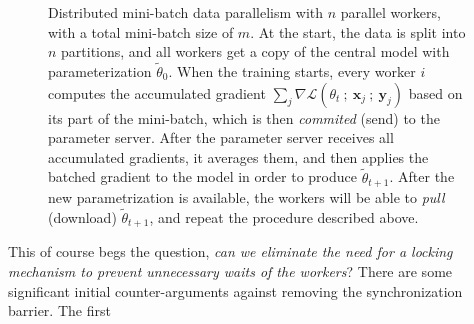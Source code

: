 \begin{figure}[H]
  \caption{Distributed mini-batch data parallelism with $n$ parallel workers, with a total mini-batch size of $m$. At the start, the data is split into $n$ partitions, and all workers get a copy of the central model with parameterization $\tilde{\theta}_0$. When the training starts, every worker $i$ computes the accumulated gradient $\sum_j \nabla \mathcal{L}(\theta_t~;~\textbf{x}_j~;~\textbf{y}_j)$ based on its part of the mini-batch, which is then \emph{commited} (send) to the parameter server. After the parameter server receives all accumulated gradients, it averages them, and then applies the batched gradient to the model in order to produce $\tilde{\theta}_{t+1}$. After the new parametrization is available, the workers will be able to \emph{pull} (download) $\tilde{\theta}_{t+1}$, and repeat the procedure described above.}
  \label{fig:distributed_mini_batch_parallelism}
\end{figure}

This of course begs the question, \emph{can we eliminate the need for a locking mechanism to prevent unnecessary waits of the workers}? There are some significant initial counter-arguments against removing the synchronization barrier. The first \\

